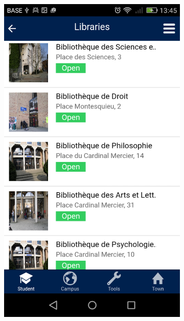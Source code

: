 \documentclass{eplmastersthesis}
\begin{document}
\begin{figure}
\begin{subfigure}[b]{0.3\textwidth}
        \includegraphics[width=\textwidth]{Images/Application_screens/Screenshot_2016-06-06-13-45-37.png}
    \end{subfigure}
    ~ %

\end{figure}
\end{document}
